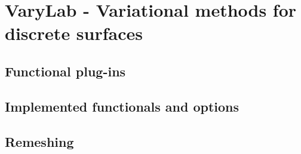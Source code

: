 \section{VaryLab - Variational methods for discrete surfaces}
\subsection{Functional plug-ins}
\subsection{Implemented functionals and options}
\subsection{Remeshing}

